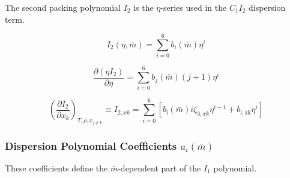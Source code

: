 \documentclass[12pt, letterpaper]{article}
\begin{document}
The second packing polynomial \(I_2\) is the \(\eta\)-series used in the \(C_1 I_2\) dispersion term.

\begin{equation}
    I_{2}(\eta, \bar{m})=\sum_{i=0}^6 b_{i}(\bar{m}) \eta^i
    \label{eq:i2_disp}
\end{equation}


\begin{equation}
    \frac{\partial(\eta I_{2})}{\partial\eta}=\sum_{i=0}^6b_{j}(\bar{m})(j+1)\eta^i
    \label{eq:deta_i2_deta}
\end{equation}


\begin{equation}
    \left(\frac{\partial I_{2}}{\partial x_{k}}\right)_{T,\rho,x_{j\neq k}}
    \equiv I_{2,xk}
    =\sum_{i=0}^{6}[b_{\mathrm{i}}(\bar{m})i\zeta_{3,xk}\eta^{i-1}+b_{\mathrm{i,xk}}\eta^{i}]
    \label{eq:i2_xk}
\end{equation}

\subsubsection{Dispersion Polynomial Coefficients \(a_i(\bar m)\)}

These coefficients define the \(\bar m\)-dependent part of the \(I_1\) polynomial.
\end{document}
